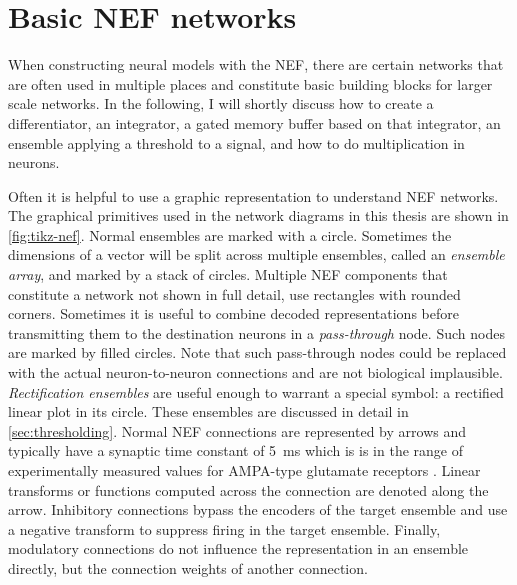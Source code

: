\chapter{Basic NEF networks}
When constructing neural models with the NEF, there are certain networks that are often used in multiple places and constitute basic building blocks for larger scale networks.
In the following, I will shortly discuss how to create a differentiator, an integrator, a gated memory buffer based on that integrator, an ensemble applying a threshold to a signal, and how to do multiplication in neurons.

Often it is helpful to use a graphic representation to understand NEF networks.
The graphical primitives used in the network diagrams in this thesis are shown in \cref{fig:tikz-nef}.
Normal ensembles are marked with a circle.
Sometimes the dimensions of a vector will be split across multiple ensembles, called an \emph{ensemble array}, and marked by a stack of circles.
Multiple NEF components that constitute a network not shown in full detail, use rectangles with rounded corners.
Sometimes it is useful to combine decoded representations before transmitting them to the destination neurons in a \emph{pass-through} node.
Such nodes are marked by filled circles.
Note that such pass-through nodes could be replaced with the actual neuron-to-neuron connections and are not biological implausible.
\emph{Rectification ensembles} are useful enough to warrant a special symbol: a rectified linear plot in its circle.
These ensembles are discussed in detail in \cref{sec:thresholding}.
Normal NEF connections are represented by arrows and typically have a synaptic time constant of \SI{5}{\milli\second} which is is in the range of experimentally measured values for AMPA-type glutamate receptors \parencite{jonas1993,spruston1995-1}.
Linear transforms or functions computed across the connection are denoted along the arrow.
Inhibitory connections bypass the encoders of the target ensemble and use a negative transform to suppress firing in the target ensemble.
Finally, modulatory connections do not influence the representation in an ensemble directly, but the connection weights of another connection.
